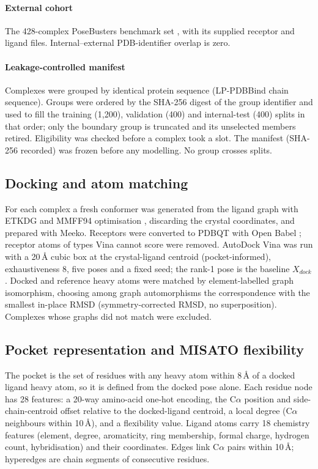\paragraph{External cohort} The 428-complex PoseBusters benchmark set \citep{buttenschoen2024posebusters}, with its
supplied receptor and ligand files. Internal--external PDB-identifier overlap is zero.

\paragraph{Leakage-controlled manifest} Complexes were grouped by identical protein sequence (LP-PDBBind chain
sequence). Groups were ordered by the SHA-256 digest of the group identifier and used to fill the training (1{,}200),
validation (400) and internal-test (400) splits in that order; only the boundary group is truncated and its unselected
members retired. Eligibility was checked before a complex took a slot. The manifest (SHA-256 recorded) was frozen before
any modelling. No group crosses splits.

\subsection{Docking and atom matching}
For each complex a fresh conformer was generated from the ligand graph with ETKDG and MMFF94 optimisation
\citep{riniker2015etkdg,halgren1996mmff}, discarding the crystal coordinates, and prepared with Meeko. Receptors were
converted to PDBQT with Open Babel \citep{oboyle2011openbabel}; receptor atoms of types Vina cannot score were removed.
AutoDock Vina was run with a 20\,\AA{} cubic box at the crystal-ligand centroid (pocket-informed), exhaustiveness 8, five
poses and a fixed seed; the rank-1 pose is the baseline $X_{dock}$. Docked and reference heavy atoms were matched by
element-labelled graph isomorphism, choosing among graph automorphisms the correspondence with the smallest in-place
RMSD (symmetry-corrected RMSD, no superposition). Complexes whose graphs did not match were excluded.

\subsection{Pocket representation and MISATO flexibility}
The pocket is the set of residues with any heavy atom within 8\,\AA{} of a docked ligand heavy atom, so it is defined
from the docked pose alone. Each residue node has 28 features: a 20-way amino-acid one-hot encoding, the C$\alpha$
position and side-chain-centroid offset relative to the docked-ligand centroid, a local degree (C$\alpha$ neighbours
within 10\,\AA{}), and a flexibility value. Ligand atoms carry 18 chemistry features (element, degree, aromaticity,
ring membership, formal charge, hydrogen count, hybridisation) and their coordinates. Edges link C$\alpha$ pairs
within 10\,\AA{}; hyperedges are chain segments of consecutive residues.


